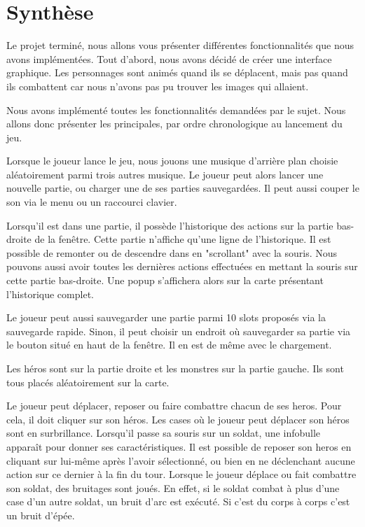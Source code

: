 \documentclass{article}
\begin{document}
\section{Synthèse}
Le projet terminé, nous allons vous présenter différentes fonctionnalités que nous avons implémentées.
Tout d'abord, nous avons décidé de créer une interface graphique.
Les personnages sont animés quand ils se déplacent, mais pas quand ils combattent car nous n'avons pas pu trouver les images qui allaient.

Nous avons implémenté toutes les fonctionnalités demandées par le sujet.
Nous allons donc présenter les principales, par ordre chronologique au lancement du jeu.

Lorsque le joueur lance le jeu, nous jouons une musique d'arrière plan choisie aléatoirement parmi trois autres musique.
Le joueur peut alors lancer une nouvelle partie, ou charger une de ses parties sauvegardées.
Il peut aussi couper le son via le menu ou un raccourci clavier.

Lorsqu'il est dans une partie, il possède l'historique des actions sur la partie bas-droite de la fenêtre. 
Cette partie n'affiche qu'une ligne de l'historique. Il est possible de remonter ou de descendre dans en "scrollant" avec la souris.
Nous pouvons aussi avoir toutes les dernières actions effectuées en mettant la souris sur cette partie bas-droite.
Une popup s'affichera alors sur la carte présentant l'historique complet.

Le joueur peut aussi sauvegarder une partie parmi 10 slots proposés via la sauvegarde rapide.
Sinon, il peut choisir un endroit où sauvegarder sa partie via le bouton situé en haut de la fenêtre.
Il en est de même avec le chargement.

Les héros sont sur la partie droite et les monstres sur la partie gauche. Ils sont tous placés aléatoirement sur la carte.

Le joueur peut déplacer, reposer ou faire combattre chacun de ses heros.
Pour cela, il doit cliquer sur son héros.
Les cases où le joueur peut déplacer son héros sont en surbrillance.
Lorsqu'il passe sa souris sur un soldat, une infobulle apparaît pour donner ses caractéristiques.
Il est possible de reposer son heros en cliquant sur lui-même après l'avoir sélectionné, ou bien en ne déclenchant aucune action sur ce dernier à la fin du tour.
Lorsque le joueur déplace ou fait combattre son soldat, des bruitages sont joués.
En effet, si le soldat combat à plus d'une case d'un autre soldat, un bruit d'arc est exécuté.
Si c'est du corps à corps c'est un bruit d'épée.
\end{document}
